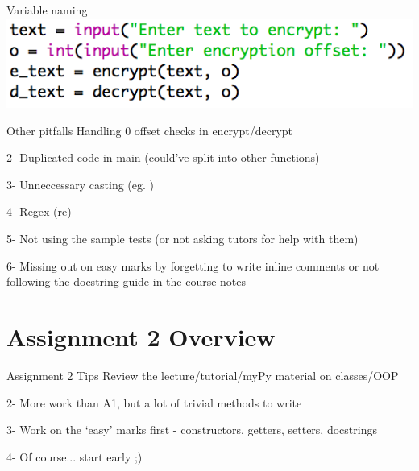 \documentclass[week2]{csse1001}
\begin{document}
\begin{topic}{Variable naming}
\includegraphics[width=\textwidth]{a1pitfalls/vname}
\end{topic}

\begin{topic}{Other pitfalls}
Handling 0 offset checks in encrypt/decrypt

\begin{subtopic}{2-}
Duplicated code in main (could've split into other functions)
\end{subtopic}

\begin{subtopic}{3-}
Unneccessary casting (eg. )
\end{subtopic}

\begin{subtopic}{4-}
Regex (re)
\end{subtopic}

\begin{subtopic}{5-}
Not using the sample tests (or not asking tutors for help with them)
\end{subtopic}

\begin{subtopic}{6-}
Missing out on easy marks by forgetting to write inline comments or not following the docstring guide in the course notes
\end{subtopic}

\end{topic}

\section{Assignment 2 Overview}

\begin{topic}{Assignment 2 Tips}
Review the lecture/tutorial/myPy material on classes/OOP

\begin{subtopic}{2-}
More work than A1, but a lot of trivial methods to write
\end{subtopic}

\begin{subtopic}{3-}
Work on the `easy' marks first - constructors, getters, setters, docstrings
\end{subtopic}

\begin{subtopic}{4-}
Of course... start early ;)
\end{subtopic}
\end{topic}
\end{document}
